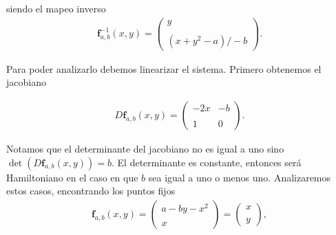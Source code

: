 siendo el mapeo inverso
\begin{eqnarray}
\mathbf{f}^{-1}_{a,b}(x,y)=\left( \begin{array}{lcc}
             y\\
             \\ (x+y^{2}-a)/-b
             \end{array}
             \right). \label{HenonI}
\end{eqnarray} 

       
Para poder analizarlo debemos linearizar el sistema. Primero obtenemos el jacobiano 
            
\begin{eqnarray}
D\mathbf{f}_{a,b}(x,y)= \left( \begin{array}{lcc}
                -2x & -b\\
                \\ 1 & 0
                \end{array}
                \right).
\end{eqnarray}

                
Notamos que el determinante del jacobiano no es igual a uno sino $\det(D\mathbf{f}_{a,b}(x,y))=b$.
El determinante es constante, entonces será Hamiltoniano en el caso en que $b$ sea igual a uno o menos uno. Analizaremos estos casos, encontrando los puntos fijos
\begin{eqnarray}
\mathbf{f}_{a,b}(x,y)=\left( \begin{array}{lcc}
               a-by-x^{2}\\
               \\ x
               \end{array}
               \right) = \left(\begin{array}{lc}
               x \\
               \\ y
               \end{array}
               \right),
\end{eqnarray}
              
